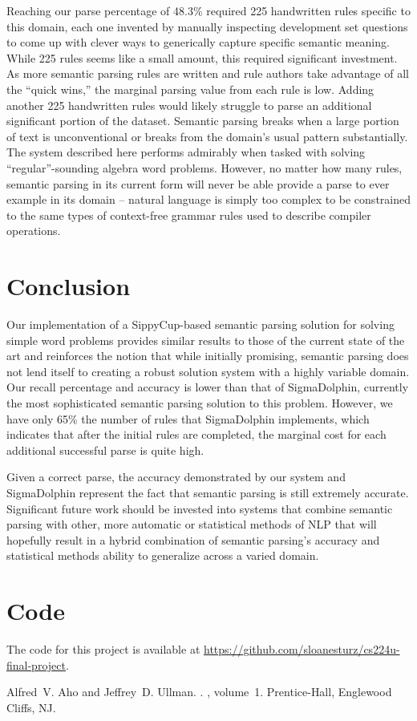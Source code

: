 \documentclass[11pt]{article}
\begin{document}
Reaching our parse percentage of 48.3\% required 225 handwritten rules specific to this domain, each one invented by manually inspecting development set questions to come up with clever ways to generically capture specific semantic meaning. While 225 rules seems like a small amount, this required significant investment. As more semantic parsing rules are written and rule authors take advantage of all the ``quick wins,'' the marginal parsing value from each rule is low. Adding another 225 handwritten rules would likely struggle to parse an additional significant portion of the dataset.
Semantic parsing breaks when a large portion of text is unconventional or breaks from the domain’s usual pattern substantially. The system described here performs admirably when tasked with solving ``regular''-sounding algebra word problems. However, no matter how many rules, semantic parsing in its current form will never be able provide a parse to ever example in its domain -- natural language is simply too complex to be constrained to the same types of context-free grammar rules used to describe compiler operations.


\section{Conclusion}
Our implementation of a SippyCup-based semantic parsing solution for solving simple word problems provides similar results to those of the current state of the art and reinforces the notion that while initially promising, semantic parsing does not lend itself to creating a robust solution system with a highly variable domain. Our recall percentage and accuracy is lower than that of SigmaDolphin, currently the most sophisticated semantic parsing solution to this problem. However, we have only 65\% the number of rules that SigmaDolphin implements, which indicates that after the initial rules are completed, the marginal cost for each additional successful parse is quite high.

Given a correct parse, the accuracy demonstrated by our system and SigmaDolphin represent the fact that semantic parsing is still extremely accurate. Significant future work should be invested into systems that combine semantic parsing with other, more automatic or statistical methods of NLP that will hopefully result in a hybrid combination of semantic parsing’s accuracy and statistical methods ability to generalize across a varied domain.

\section{Code}
The code for this project is available at \url{https://github.com/sloanesturz/cs224u-final-project}.

%
%
%
\begin{thebibliography}{}
Alfred~V. Aho and Jeffrey~D. Ullman.
.
, volume~1.
\newblock Prentice-{Hall}, Englewood Cliffs, NJ.
\end{thebibliography}
\end{document}
